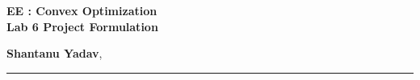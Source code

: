 \documentclass[11pt]{article}
\begin{document}
 \begin{center}
         {\LARGE \bf
	 EE : Convex Optimization \\
             Lab 6 Project Formulation
         }
 \end{center}
 \vspace{1ex}
 \begin{center}
	 {\Large \bf Shantanu Yadav}, 
 \end{center}
 \begin{center}
	 \hrule
 \end{center}
 \vspace{1ex}
\end{document}
